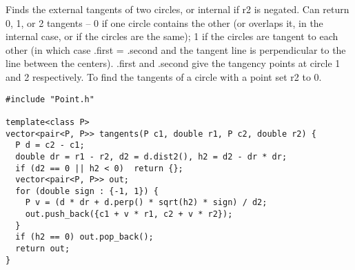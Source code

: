 Finds the external tangents of two circles, or internal if r2 is negated.
Can return 0, 1, or 2 tangents -- 0 if one circle contains the other (or overlaps it, in the internal case, or if the circles are the same);
1 if the circles are tangent to each other (in which case .first = .second and the tangent line is perpendicular to the line between the centers).
.first and .second give the tangency points at circle 1 and 2 respectively.
To find the tangents of a circle with a point set r2 to 0.
\begin{verbatim}
#include "Point.h"

template<class P>
vector<pair<P, P>> tangents(P c1, double r1, P c2, double r2) {
  P d = c2 - c1;
  double dr = r1 - r2, d2 = d.dist2(), h2 = d2 - dr * dr;
  if (d2 == 0 || h2 < 0)  return {};
  vector<pair<P, P>> out;
  for (double sign : {-1, 1}) {
    P v = (d * dr + d.perp() * sqrt(h2) * sign) / d2;
    out.push_back({c1 + v * r1, c2 + v * r2});
  }
  if (h2 == 0) out.pop_back();
  return out;
}
\end{verbatim}
